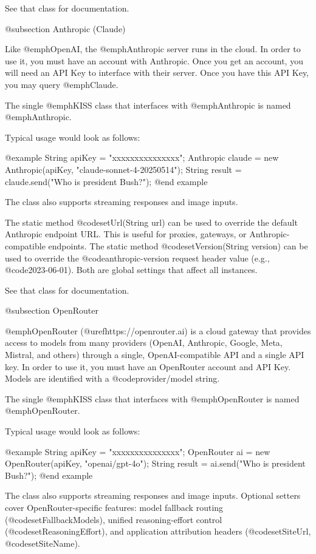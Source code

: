 See that class for documentation.

@subsection Anthropic (Claude)

Like @emph{OpenAI}, the @emph{Anthropic} server runs in the cloud.
In order to use it, you must have an account with Anthropic.
Once you get an account, you will need an API Key to interface with their server.
Once you have this API Key, you may query @emph{Claude}.

The single @emph{KISS} class that interfaces with @emph{Anthropic} is
named @emph{Anthropic}.

Typical usage would look as follows:

@example
    String apiKey = "xxxxxxxxxxxxxxx";
    Anthropic claude = new Anthropic(apiKey, "claude-sonnet-4-20250514");
    String result = claude.send("Who is president Bush?");
@end example

The class also supports streaming responses and image inputs.

The static method @code{setUrl(String url)} can be used to override the
default Anthropic endpoint URL.  This is useful for proxies, gateways, or
Anthropic-compatible endpoints.  The static method
@code{setVersion(String version)} can be used to override the
@code{anthropic-version} request header value (e.g., @code{2023-06-01}).
Both are global settings that affect all instances.

See that class for documentation.

@subsection OpenRouter

@emph{OpenRouter} (@uref{https://openrouter.ai}) is a cloud gateway
that provides access to models from many providers (OpenAI, Anthropic,
Google, Meta, Mistral, and others) through a single, OpenAI-compatible
API and a single API key.  In order to use it, you must have an
OpenRouter account and API Key.  Models are identified with a
@code{provider/model} string.

The single @emph{KISS} class that interfaces with @emph{OpenRouter} is
named @emph{OpenRouter}.

Typical usage would look as follows:

@example
    String apiKey = "xxxxxxxxxxxxxxx";
    OpenRouter ai = new OpenRouter(apiKey, "openai/gpt-4o");
    String result = ai.send("Who is president Bush?");
@end example

The class also supports streaming responses and image inputs.
Optional setters cover OpenRouter-specific features: model fallback
routing (@code{setFallbackModels}), unified reasoning-effort control
(@code{setReasoningEffort}), and application attribution headers
(@code{setSiteUrl}, @code{setSiteName}).

